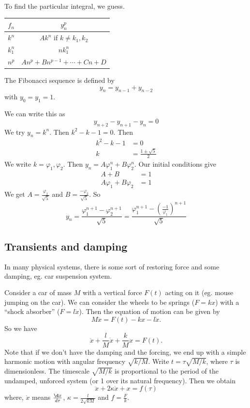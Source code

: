 \documentclass[a4paper]{article}
\begin{document}
To find the particular integral, we guess.
\begin{center}
  \begin{tabular}{cc}
    \toprule
    $f_n$ & $y_n^p$\\
    \midrule
    $k^n$ & $Ak^n$ if $k \not= k_1, k_2$\\
    $k_1^n$ & $nk_1^n$\\
    $n^p$ & $An^p + Bn^{p - 1} + \cdots + Cn + D$\\
    \bottomrule
  \end{tabular}
\end{center}

\begin{eg}
  The Fibonacci sequence is defined by
  \[
    y_n = y_{n - 1} + y_{n - 2}
  \]
  with $y_0 = y_1 = 1$.

  We can write this as
  \[
    y_{n + 2} - y_{n + 1} - y_n = 0
  \]
  We try $y_n = k^n$. Then $k^2 - k - 1 = 0$. Then
  \begin{align*}
    k^2 - k - 1 &= 0\\
    k &= \frac{1 \pm \sqrt{5}}{2}
  \end{align*}
  We write $k = \varphi_1, \varphi_2$. Then $y_n = A\varphi_1^n + B\varphi_2^n$. Our initial conditions give
  \begin{align*}
    A + B &= 1\\
    A\varphi_1 + B\varphi_2 &= 1
  \end{align*}
  We get $\displaystyle A = \frac{\varphi_1}{\sqrt{5}}$ and $\displaystyle B = \frac{-\varphi_2}{\sqrt{5}}$. So
  \[
    y_n = \frac{\varphi_1^{n + 1} - \varphi_2^{n + 1}}{\sqrt{5}} = \frac{\varphi_1^{n + 1} - \left(\frac{-1}{\varphi_1}\right)^{n + 1}}{\sqrt{5}}
  \]
\end{eg}

\subsection{Transients and damping}
In many physical systems, there is some sort of restoring force and some damping, eg. car suspension system.

Consider a car of mass $M$ with a vertical force $F(t)$ acting on it (eg. mouse jumping on the car). We can consider the wheels to be springs ($F = kx$) with a ``shock absorber'' ($F = l\dot x$). Then the equation of motion can be given by
\[
  M\ddot x = F(t) - kx - l\dot x.
\]
So we have
\[
  \ddot x + \frac{l}{M}\dot x + \frac{k}{M}x = F(t).
\]
Note that if we don't have the damping and the forcing, we end up with a simple harmonic motion with angular frequency $\sqrt{k/M}$. Write $t = \tau \sqrt{M/k}$, where $\tau$ is dimensionless. The timescale $\sqrt{M/k}$ is proportional to the period of the undamped, unforced system (or 1 over its natural frequency). Then we obtain
\[
  \ddot x + 2\kappa\dot x + x = f(\tau)
\]
where, $\dot x$ means $\frac{\d x}{d\tau}$, $\kappa = \frac{l}{2\sqrt{kM}}$ and $f = \frac{F}{k}$.
\end{document}
